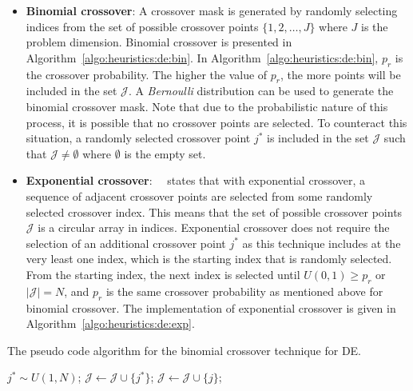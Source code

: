 \begin{itemize}
      \item \textbf{Binomial crossover}: A crossover mask is generated by randomly selecting indices from the set of possible crossover points $\{1,2,\dots,J\}$ where $J$ is the problem dimension. Binomial crossover is presented in Algorithm~\ref{algo:heuristics:de:bin}. In Algorithm~\ref{algo:heuristics:de:bin}, $p_{r}$ is the crossover probability. The higher the value of $p_{r}$, the more points will be included in the set $\mathcal{J}$. A \textit{Bernoulli} distribution can be used to generate the binomial crossover mask. Note that due to the probabilistic nature of this process, it is possible that no crossover points are selected. To counteract this situation, a randomly selected crossover point $j^{*}$ is included in the set $\mathcal{J}$ such that $\mathcal{J} \neq \emptyset$ where $\emptyset$ is the empty set.

      \item \textbf{Exponential crossover}:~\citeauthor{ref:engelbrecht:2007}~\cite{ref:engelbrecht:2007} states that with exponential crossover, a sequence of adjacent crossover points are selected from some randomly selected crossover index. This means that the set of possible crossover points $\mathcal{J}$ is a circular array in indices. Exponential crossover does not require the selection of an additional crossover point $j^{*}$ as this technique includes at the very least one index, which is the starting index that is randomly selected. From the starting index, the next index is selected until $U(0,1) \geq p_{r}$ or $|\mathcal{J}| = N$, and $p_{r}$ is the same crossover probability as mentioned above for binomial crossover. The implementation of exponential crossover is given in Algorithm~\ref{algo:heuristics:de:exp}.
\end{itemize}

\begin{algorithm}[H]
      \caption{The pseudo code algorithm for the binomial crossover technique for \acs{DE}.}
      \label{algo:heuristics:de:bin}
      \begin{algorithmic}
            \State $j^{*} \sim U(1,N)$;
            \State $\mathcal{J} \gets \mathcal{J} \cup \{j^{*}\}$;
            \State $\mathcal{J} \gets \mathcal{J} \cup \{j\}$;
            \EndIf
            \EndFor
      \end{algorithmic}
\end{algorithm}

